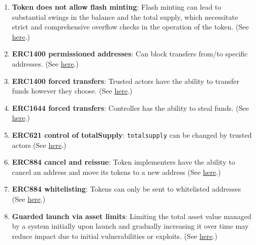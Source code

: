 \begin{enumerate}
\item\textbf{Token does not allow flash minting}: Flash minting can lead to substantial swings in the balance and the total supply, which necessitate strict and comprehensive overflow checks in the operation of the token. (See \href{https://github.com/crytic/building-secure-contracts/blob/master/development-guidelines/token\_integration.md\#token-scarcity}{here}.)

\item\textbf{ERC1400 permissioned addresses}: Can block transfers from/to specific addresses. (See \href{https://gist.github.com/shayanb/cd495e23c7cf1a8b269f8ce7fd198538\#file-token\_checklist-md}{here}.)

\item\textbf{ERC1400 forced transfers}: Trusted actors have the ability to transfer funds however they choose. (See \href{https://gist.github.com/shayanb/cd495e23c7cf1a8b269f8ce7fd198538\#file-token\_checklist-md}{here}.)

\item\textbf{ERC1644 forced transfers}: Controller has the ability to steal funds. (See \href{https://gist.github.com/shayanb/cd495e23c7cf1a8b269f8ce7fd198538\#file-token\_checklist-md}{here}.)

\item\textbf{ERC621 control of totalSupply}: \verb|totalsupply| can be changed by trusted actors (See \href{https://gist.github.com/shayanb/cd495e23c7cf1a8b269f8ce7fd198538\#file-token\_checklist-md}{here}.)

\item\textbf{ERC884 cancel and reissue}: Token implementers have the ability to cancel an address and move its tokens to a new address (See \href{https://gist.github.com/shayanb/cd495e23c7cf1a8b269f8ce7fd198538\#file-token\_checklist-md}{here}.)

\item\textbf{ERC884 whitelisting}: Tokens can only be sent to whitelisted addresses (See \href{https://gist.github.com/shayanb/cd495e23c7cf1a8b269f8ce7fd198538\#file-token\_checklist-md}{here}.)

\item\textbf{Guarded launch via asset limits}: Limiting the total asset value managed by a system initially upon launch and gradually increasing it over time may reduce impact due to initial vulnerabilities or exploits. (See \href{https://medium.com/electric-capital/derisking-defi-guarded-launches-2600ce730e0a\#:~:text=Guarded%20Launches:%20Protecting%20Users%20with%20Limits\&text=A%20new%20contract%20is%20deployed,product%20in%20a%20limited%20scope.}{here}.)


\end{enumerate}
